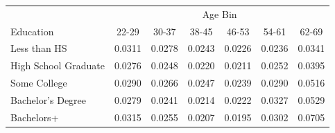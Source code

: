 \begin{tabular}{lcccccc}
\hline\hline
 & \multicolumn{6}{c}{Age Bin} \\
Education & 22-29 & 30-37 & 38-45 & 46-53 & 54-61 & 62-69 \\
\hline
Less than HS&0.0311&0.0278&0.0243&0.0226&0.0236&0.0341\\
High School Graduate&0.0276&0.0248&0.0220&0.0211&0.0252&0.0395\\
Some College&0.0290&0.0266&0.0247&0.0239&0.0290&0.0516\\
Bachelor's Degree&0.0279&0.0241&0.0214&0.0222&0.0327&0.0529\\
Bachelors+&0.0315&0.0255&0.0207&0.0195&0.0302&0.0705\\
\hline\hline
\end{tabular}
